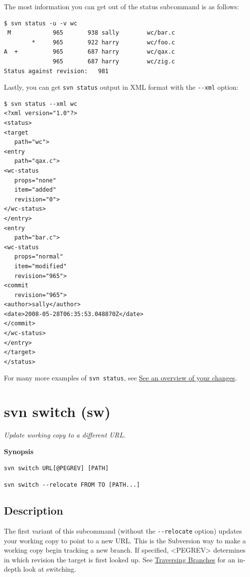 The most information you can get out of the status subcommand is as
follows:

\begin{verbatim}
$ svn status -u -v wc
 M            965       938 sally        wc/bar.c
        *     965       922 harry        wc/foo.c
A  +          965       687 harry        wc/qax.c
              965       687 harry        wc/zig.c
Status against revision:   981
\end{verbatim}

Lastly, you can get \texttt{svn\ status} output in XML format with the
\texttt{-\/-xml} option:

\begin{verbatim}
$ svn status --xml wc
<?xml version="1.0"?>
<status>
<target
   path="wc">
<entry
   path="qax.c">
<wc-status
   props="none"
   item="added"
   revision="0">
</wc-status>
</entry>
<entry
   path="bar.c">
<wc-status
   props="normal"
   item="modified"
   revision="965">
<commit
   revision="965">
<author>sally</author>
<date>2008-05-28T06:35:53.048870Z</date>
</commit>
</wc-status>
</entry>
</target>
</status>
\end{verbatim}

For many more examples of \texttt{svn\ status}, see
\hyperref[svn.tour.cycle.examine.status]{See an overview of your
changes}.

\section{svn switch (sw)}\label{svn.ref.svn.c.switch}

\emph{Update working copy to a different URL.}

\textbf{Synopsis}

\texttt{svn\ switch\ URL{[}@PEGREV{]}\ {[}PATH{]}}

\texttt{svn\ switch\ -\/-relocate\ FROM\ TO\ {[}PATH...{]}}

\subsection{Description}

The first variant of this subcommand (without the \texttt{-\/-relocate}
option) updates your working copy to point to a new URL. This is the
Subversion way to make a working copy begin tracking a new branch. If
specified, \textless PEGREV\textgreater{} determines in which revision
the target is first looked up. See
\hyperref[svn.branchmerge.switchwc]{Traversing Branches} for an in-depth
look at switching.

